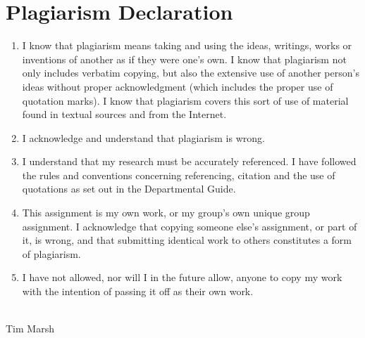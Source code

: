 \section*{Plagiarism Declaration}

	\begin{enumerate}
	
	\item
	I know that plagiarism means taking and using the ideas, writings, works
	or inventions of another as if they were one's own. I know that plagiarism
	not only includes verbatim copying, but also the extensive use of another
	person's ideas without proper acknowledgment (which includes the proper
	use of quotation marks). I know that plagiarism covers this sort of use of
	material found in textual sources and from the Internet.
	
	\item
	I acknowledge and understand that plagiarism is wrong.
	
	\item
	I understand that my research must be accurately referenced. I have
	followed the rules and conventions concerning referencing, citation and
	the use of quotations as set out in the Departmental Guide.
	
	\item
	This assignment is my own work, or my group's own unique group assignment.
	I acknowledge that copying someone else's assignment, or part of
	it, is wrong, and that submitting identical work to others constitutes a
	form of plagiarism.
	
	\item
	I have not allowed, nor will I in the future allow, anyone to copy my work
	with the intention of passing it off as their own work.\\
	\\
	
	\end{enumerate}
		
	Tim Marsh
	
	\newpage